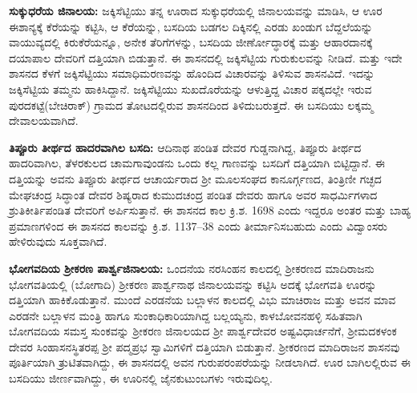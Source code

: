 \textbf{ಸುಕ್ಕುಧರೆಯ ಜಿನಾಲಯ:} ಜಕ್ಕಿಸೆಟ್ಟಿಯು ತನ್ನ ಊರಾದ ಸುಕ್ಕುಧರೆಯಲ್ಲಿ ಜಿನಾಲಯವನ್ನು ಮಾಡಿಸಿ, ಆ ಊರ ಈಶಾನ್ಯಕ್ಕೆ ಕೆರೆಯನ್ನು ಕಟ್ಟಿಸಿ, ಆ ಕೆರೆಯನ್ನು, ಬಸದಿಯ ಬಡಗಲ ದಿಕ್ಕಿನಲ್ಲಿ ಎರಡು ಖಂಡುಗ ಬೆದ್ದಲೆಯನ್ನು ವಾಯುವ್ಯದಲ್ಲಿ ಕಿರುಕೆರೆಯನ್ನೂ, ಅನೇಕ ತೆರಿಗೆಗಳನ್ನು, ಬಸದಿಯ ಜೀರ್ಣೋದ್ಧಾರಕ್ಕೆ ಮತ್ತು ಆಹಾರದಾನಕ್ಕೆ ದಯಾಪಾಲ ದೇವರಿಗೆ ದತ್ತಿಯಾಗಿ ಬಿಡುತ್ತಾನೆ. ಈ ಶಾಸನದಲ್ಲಿ ಜಕ್ಕಿಸೆಟ್ಟಿಯ ಗುರುಕುಲವನ್ನು ನೀಡಿದೆ. ಮತ್ತು ಇದೇ ಶಾಸನದ ಕೆಳಗೆ ಜಕ್ಕಿಸೆಟ್ಟಿಯು ಸಮಾಧಿಮರಣವನ್ನು ಹೊಂದಿದ ವಿಚಾರವನ್ನು ತಿಳಿಸುವ ಶಾಸನವಿದೆ. ಇದನ್ನು ಜಕ್ಕಿಸೆಟ್ಟಿಯ ತಮ್ಮನು ಹಾಕಿಸಿದ್ದಾನೆ. ಜಕ್ಕಿಸೆಟ್ಟಿಯು ಸುಖದೊರೆಯನ್ನು ಆಳುತ್ತಿದ್ದ ವಿಚಾರ ಪಕ್ಕದಲ್ಲೇ ಇರುವ ಪುರದಕಟ್ಟೆ(ಬೇಚಿರಾಕ್​) ಗ್ರಾಮದ ತೋಟದಲ್ಲಿರುವ ಶಾಸನದಿಂದ ತಿಳಿದುಬರುತ್ತದೆ. ಈ ಬಸದಿಯು ಲಕ್ಕಮ್ಮ ದೇವಾಲಯವಾಗಿದೆ. 

\textbf{ತಿಪ್ಪೂರು ತೀರ್ಥದ ಹಾದರವಾಗಿಲ ಬಸದಿ:} ಆದಿನಾಥ ಪಂಡಿತ ದೇವರ ಗುಡ್ಡನಾಗಿದ್ದ, ತಿಪ್ಪೂರು ತೀರ್ಥದ ಹಾದರಿವಾಗಿಲ, ತೆಳರಕುಲದ ಚಾಮಗಾವುಂಡನು ಒಂದು ಕಲ್ಲ ಗಾಣವನ್ನು ಬಸದಿಗೆ ದತ್ತಿಯಾಗಿ ಬಿಟ್ಟಿದ್ದಾನೆ. ಈ ದತ್ತಿಯನ್ನು ಅವನು ತಿಪ್ಪೂರು ತೀರ್ಥದ ಆಚಾರ್ಯರಾದ ಶ‍್ರೀ ಮೂಲಸಂಘದ ಕಾನೂರ್ಗ್ಗಣದ, ತಿಂತ್ರಿಣೀ ಗಚ್ಛದ ಮೇಘಚಂದ್ರ ಸಿದ್ಧಾಂತ ದೇವರ ಶಿಷ್ಯರಾದ ಕುಮುದಚಂದ್ರ ಪಂಡಿತ ದೇವರು ಹಾಗೂ ಅವರ ಸಾಧರ್ಮಿಗಳಾದ ಶ್ರುತಿಕೀರ್ತಿಪಂಡಿತ ದೇವರಿಗೆ ಅರ್ಪಿಸುತ್ತಾನೆ. ಈ ಶಾಸನದ ಕಾಲ ಕ್ರಿ.ಶ. 1698 ಎಂದು ಇದ್ದರೂ ಅಂತರ ಮತ್ತು ಬಾಹ್ಯ ಪ್ರಮಾಣಗಳಿಂದ ಈ ಶಾಸನದ ಕಾಲವನ್ನು ಕ್ರಿ.ಶ. 1137–38 ಎಂದು ತೀರ್ಮಾನಿಸಬಹುದು ಎಂದು ವಿದ್ವಾಂಸರು ಹೇಳಿರುವುದು ಸೂಕ್ತವಾಗಿದೆ.

\textbf{ಭೋಗವದಿಯ ಶ‍್ರೀಕರಣ ಪಾರ್ಶ್ವಜಿನಾಲಯ: } ಒಂದನೆಯ ನರಸಿಂಹನ ಕಾಲದಲ್ಲಿ ಶ‍್ರೀಕರಣದ ಮಾದಿರಾಜನು ಭೋಗವತಿಯಲ್ಲಿ (ಬೋಗಾದಿ) ಶ‍್ರೀಕರಣ ಪಾರ್ಶ್ವನಾಥ ಜಿನಾಲಯವನ್ನು ಕಟ್ಟಿಸಿ ಅದಕ್ಕೆ ಭೋಗವತಿ ಊರನ್ನು ದತ್ತಿಯಾಗಿ ಹಾಕಿಕೊಡುತ್ತಾನೆ. ಮುಂದೆ ಎರಡನೆಯ ಬಲ್ಲಾಳನ ಕಾಲದಲ್ಲಿ ವಿಭು ಮಾಚಿರಾಜ ಮತ್ತು ಅವನ ಮಾವ ಎರಡನೇ ಬಲ್ಲಾಳನ ಮಂತ್ರಿ ಹಾಗೂ ಸುಂಕಾಧಿಕಾರಿಯಾಗಿದ್ದ ಬಲ್ಲಯ್ಯನು, ಕಾಳಬೋವನಹಳ್ಳಿ ಸಹಿತವಾಗಿ ಬೋಗವದಿಯ ಸಮಸ್ತ ಸುಂಕವನ್ನು ಶ‍್ರೀಕರಣ ಜಿನಾಲಯದ ಶ‍್ರೀ ಪಾರ್ಶ್ವದೇವರ ಅಷ್ಟವಿಧಾರ್ಚನೆಗೆ, ಶ‍್ರೀಮದಕಳಂಕ ದೇವರ ಸಿಂಹಾಸನಸ್ಥಿತರಪ್ಪ ಶ‍್ರೀ ಪದ್ಮಪ್ರಭ ಸ್ವಾಮಿಗಳಿಗೆ ದತ್ತಿಯಾಗಿ ಬಿಡುತ್ತಾನೆ. ಶ‍್ರೀಕರಣದ ಮಾದಿರಾಜನ ಶಾಸನವು ಪೂರ್ತಿಯಾಗಿ ತ್ರುಟಿತವಾಗಿದ್ದು, ಈ ಶಾಸನದಲ್ಲಿ ಅವನ ಗುರುಪರಂಪರೆಯನ್ನು ನೀಡಲಾಗಿದೆ. ಊರ ಬಾಗಿಲಲ್ಲಿರುವ ಈ ಬಸದಿಯು ಜೀರ್ಣವಾಗಿದ್ದು, ಈ ಊರಿನಲ್ಲಿ ಜೈನಕುಟುಂಬಗಳು ಇರುವುದಿಲ್ಲ.

